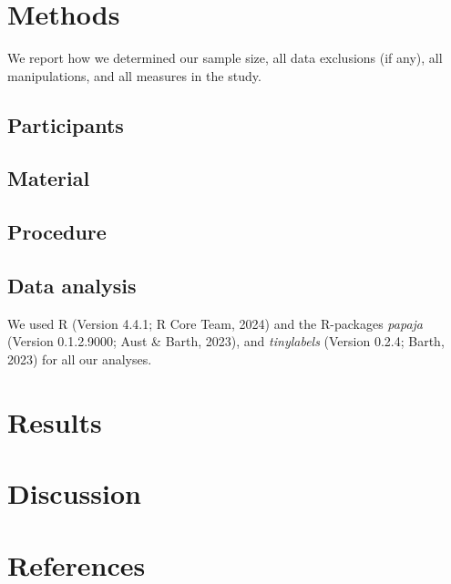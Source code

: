 \documentclass[
  man]{apa7}
\begin{document}
\section{Methods}\label{methods}

We report how we determined our sample size, all data exclusions (if any), all manipulations, and all measures in the study.

\subsection{Participants}\label{participants}

\subsection{Material}\label{material}

\subsection{Procedure}\label{procedure}

\subsection{Data analysis}\label{data-analysis}

We used R (Version 4.4.1; R Core Team, 2024) and the R-packages \emph{papaja} (Version 0.1.2.9000; Aust \& Barth, 2023), and \emph{tinylabels} (Version 0.2.4; Barth, 2023) for all our analyses.

\section{Results}\label{results}

\section{Discussion}\label{discussion}

\newpage

\section{References}\label{references}
\end{document}
